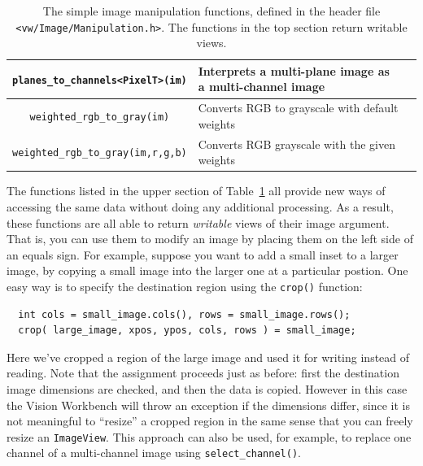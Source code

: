 \begin{table}[t]
\begin{centering}
\begin{tabular}{|c|l|l|}
\verb#planes_to_channels<PixelT>(im)# & Interprets a multi-plane image as a multi-channel image \\ \hline
\verb#weighted_rgb_to_gray(im)# & Converts RGB to grayscale with default weights \\ \hline
\verb#weighted_rgb_to_gray(im,r,g,b)# & Converts RGB grayscale with the given weights \\ \hline
\end{tabular}
\caption{The simple image manipulation functions, defined in the header file 
{\tt <vw/Image/Manipulation.h>}.  The functions in the top section return writable views.}
\label{tbl:image-manipulation}
\end{centering}\end{table}

The functions listed in the upper section of Table~\ref{tbl:image-manipulation} 
all provide new ways of accessing the same data without doing any additional 
processing.  As a result, these functions are all able to return {\it writable} 
views of their image argument.  That is, you can use them to modify an image by 
placing them on the left side of an equals sign.  For example, suppose you want 
to add a small inset to a larger image, by copying a small image into the larger 
one at a particular postion.  One easy way is to specify the destination region 
using the \verb#crop()# function:
\begin{verbatim}
  int cols = small_image.cols(), rows = small_image.rows();
  crop( large_image, xpos, ypos, cols, rows ) = small_image;
\end{verbatim}
Here we've cropped a region of the large image and used it for writing
instead of reading.  Note that the assignment proceeds just as before: 
first the destination image dimensions are checked, and then the data 
is copied.  However in this case the Vision Workbench will throw an 
exception if the dimensions differ, since it is not meaningful to 
``resize'' a cropped region in the same sense that you can freely 
resize an \verb#ImageView#.  This approach can also be used, for example, 
to replace one channel of a multi-channel image using
\verb#select_channel()#.

